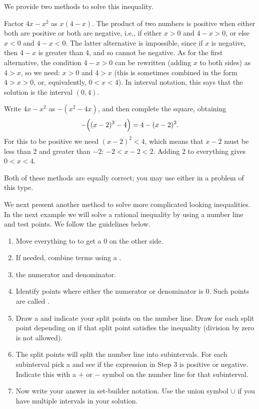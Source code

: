\begin{solution}
We provide two methods to solve this inequality.

\bigskip
\noindent
{} Factor $4x-x^2$ as $x(4-x)$.  The product of two numbers
is positive when either both are positive or both are negative, i.e., if
either $x>0$ and $4-x>0$, or else $x<0$ and $4-x<0$.  The latter alternative
is impossible, since if $x$ is negative, then $4-x$ is greater than 4, and
so cannot be negative.  As for the first alternative, the condition $4-x>0$
can be rewritten (adding $x$ to both sides) as $4>x$, so we need:
$x>0$ and $4>x$ (this is sometimes combined in the form $4>x>0$, or,
equivalently, $0<x<4$).  In interval notation, this says that the solution
is the interval $(0,4)$.

\bigskip
\noindent
{}  Write $4x-x^2$ as $-(x^2-4x)$, and then complete
the square, obtaining 
$$-\Bigl((x-2)^2-4\Bigr)=4-(x-2)^2.$$  
For this to be positive we need $(x-2)^2<4$, which means that $x-2$ must be less
than 2 and greater than $-2$:  $-2<x-2<2$.  Adding 2 to everything gives
$0<x<4$.  

\bigskip
\noindent
Both of these methods are equally correct; you may use either
in a problem of this type.
\end{solution}

We next present another method to solve more complicated looking inequalities.
In the next example we will solve a rational inequality by using 
a number line and test points. We follow the guidelines below.\\

\begin{formulabox}
\begin{enumerate}\itemsep0em 
	\item Move everything to  to get a $0$ on the other side.
	\item If needed, combine terms using a .
	\item {} the numerator and denominator.
	\item Identify points where either the numerator or denominator is $0$. Such points
				are called .
	\item Draw a  and indicate your split points on the number line. 
				Draw  for each split point depending on 
				if that split point satisfies the inequality (division by zero is not allowed).
	\item The split points will split the number line into subintervals. For each 
				subinterval pick a  and see if the expression in Step 3 
				is positive or negative. Indicate this with a $+$ or $-$ symbol on the 
				number line for that subinterval.
	\item Now write your answer in set-builder notation. Use the union symbol 
				$\cup$ if you have multiple intervals in your solution.
\end{enumerate}
\end{formulabox}

